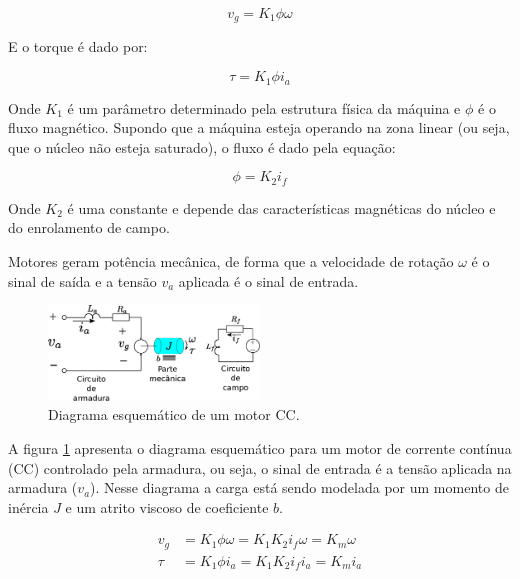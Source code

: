 \begin{equation}
    v_g = K_{1}\phi\omega
\end{equation}

E o torque é dado por:

\begin{equation}
    \tau = K_{1} \phi i_a 
\end{equation}

Onde $K_1$ é um parâmetro determinado pela estrutura física da máquina e $\phi$ é o fluxo magnético. Supondo que a máquina esteja operando na zona linear (ou seja, que o núcleo não esteja saturado), o fluxo é dado pela equação:

\begin{equation}
    \phi = K_{2}i_f
\end{equation}

Onde $K_2$ é uma constante e depende das características magnéticas do núcleo e do enrolamento de campo.

Motores geram potência mecânica, de forma que a velocidade de rotação $\omega$ é o sinal de saída e a tensão $v_a$ aplicada é o sinal de entrada. 

\begin{figure}[H]
    \centering
    \includegraphics[width=0.5\textwidth]{figuras/ilustracoes/esquematico_motor_dc.eps}
    \caption{Diagrama esquemático de um motor CC.}
    \label{fig:modelo_motor_dc}
\end{figure}


A figura \ref{fig:modelo_motor_dc} apresenta o diagrama esquemático para um motor de corrente contínua (CC) controlado pela armadura, ou seja, o sinal de entrada é a tensão aplicada na armadura ($v_a$). Nesse diagrama a carga está sendo modelada por um momento de inércia $J$ e um atrito viscoso de coeficiente $b$.

\begin{align*}
    v_g &= K_{1}\phi\omega= K_{1}K_{2}i_{f}\omega = K_{m}\omega\\
    \tau &= K_{1} \phi i_{a}= K_{1} K_{2}i_{f} i_{a} = K_{m}i_{a}
\end{align*}

